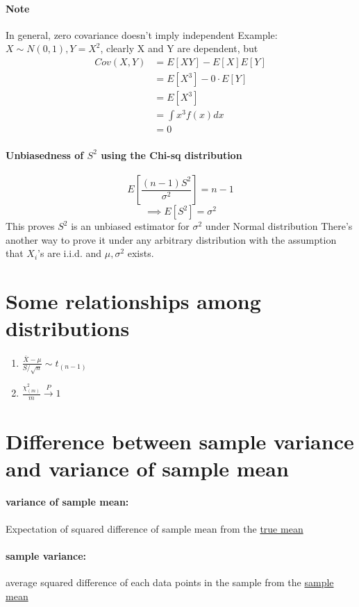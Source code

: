 \documentclass[11pt]{article}
\newcommand{\under}[1]{\underline{#1}}
\begin{document}
 \paragraph{Note} In general, zero covariance doesn't imply independent \newline
 Example: $X \sim N(0,1), Y = X^2$, clearly X and Y are dependent, but 
 \begin{align*}
 Cov(X,Y) &= E[XY] - E[X]E[Y] \\
 &=E[X^3]-0\cdot E[Y]\\
 &=E[X^3]\\
 &=\int x^3f(x)dx\\
 &=0 \tag{since $x^3f(x)$ is centro-symmetric}
 \end{align*}
 \paragraph{Unbiasedness of $S^2$ using the Chi-sq distribution}
 $$E[\frac{(n-1)S^2}{\sigma^2}] = n-1$$
 $$\implies E[S^2] = \sigma^2$$
 This proves $S^2$ is an unbiased estimator for $\sigma^2$ under Normal distribution \newline
 There's another way to prove it under any arbitrary distribution with the assumption that $X_i$'s are i.i.d. and $\mu, \sigma^2$ exists.
 \section{Some relationships among distributions}
 \begin{enumerate}
 	\item $\frac{\bar X - \mu}{S/\sqrt{n}} \sim t_{(n-1)}$
 	\item $\frac{\chi^2_{(m)}}{m} \overset{P}{\rightarrow}1$
 \end{enumerate} 
 \section{Difference between sample variance and variance of sample mean}
 \paragraph{variance of sample mean:} Expectation of squared difference of sample mean from the \under{true mean}
 \paragraph{sample variance:} average squared difference of each data points in the sample from the \under{sample mean}
\end{document}
